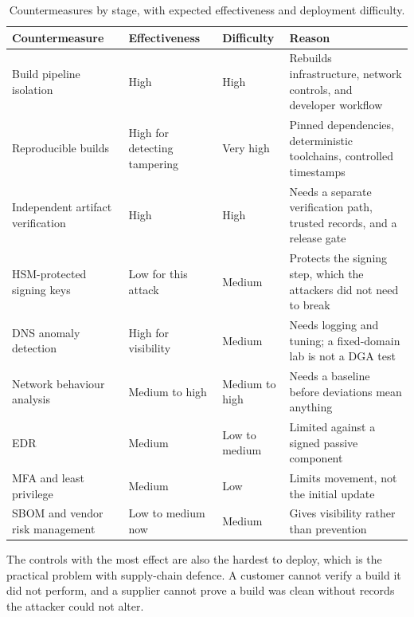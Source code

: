 \begin{table}[H]
\centering
\footnotesize
\caption{Countermeasures by stage, with expected effectiveness and deployment difficulty.}
\label{tab:countermeasures}
\begin{tabular}{@{}>{\RaggedRight}p{3.5cm}>{\RaggedRight}p{3.3cm}>{\RaggedRight}p{2.9cm}>{\RaggedRight}p{4.9cm}@{}}
\toprule
\textbf{Countermeasure} & \textbf{Effectiveness} & \textbf{Difficulty} & \textbf{Reason} \\
\midrule
Build pipeline isolation & High & High & Rebuilds infrastructure, network controls, and developer workflow \\
Reproducible builds & High for detecting tampering & Very high & Pinned dependencies, deterministic toolchains, controlled timestamps \\
Independent artifact verification & High & High & Needs a separate verification path, trusted records, and a release gate \\
HSM-protected signing keys & Low for this attack & Medium & Protects the signing step, which the attackers did not need to break \\
DNS anomaly detection & High for visibility & Medium & Needs logging and tuning; a fixed-domain lab is not a DGA test \\
Network behaviour analysis & Medium to high & Medium to high & Needs a baseline before deviations mean anything \\
EDR & Medium & Low to medium & Limited against a signed passive component \\
MFA and least privilege & Medium & Low & Limits movement, not the initial update \\
SBOM and vendor risk management & Low to medium now & Medium & Gives visibility rather than prevention \\
\bottomrule
\end{tabular}
\end{table}

The controls with the most effect are also the hardest to deploy, which is the practical problem with supply-chain defence. A customer cannot verify a build it did not perform, and a supplier cannot prove a build was clean without records the attacker could not alter.
